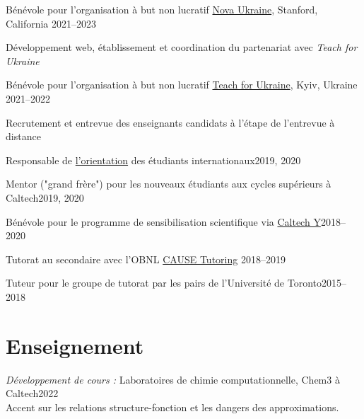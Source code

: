 \documentclass[margin,line]{res}
\newenvironment{list1}{
 \begin{list}{\ding{113}}{%
  \setlength{\itemsep}{0in}
  \setlength{\parsep}{0in} \setlength{\parskip}{0in}
  \setlength{\topsep}{0in} \setlength{\partopsep}{0in} 
  \setlength{\leftmargin}{0.17in}}}{\end{list}}
\begin{document}
\begin{resume}
\vspace*{-1mm}

Bénévole pour l'organisation à but non lucratif \href{https://novaukraine.org/}{Nova Ukraine}, Stanford, California \hfill{2021--2023}

\begin{list1}
\item[]Développement web, établissement et coordination du partenariat avec {\em Teach for Ukraine}
\end{list1}

\vspace{-0.3cm}

Bénévole pour l'organisation à but non lucratif \href{https://teachforukraine.org/en/}{Teach for Ukraine}, Kyiv, Ukraine \hfill{2021--2022}

\begin{list1}
\item[]Recrutement et entrevue des enseignants candidats à l'étape de l'entrevue à distance
\end{list1}

\vspace{-0.3cm}

Responsable de \href{https://international.caltech.edu/Orientation/isp}{l'orientation} des étudiants internationaux\hfill{2019, 2020}

\vspace{-0.3cm}

Mentor ("grand frère") pour les nouveaux étudiants aux cycles supérieurs à Caltech\hfill{2019, 2020}

\vspace{-0.3cm}

Bénévole pour le programme de sensibilisation scientifique via \href{https://www.caltechy.org/student-opportunities}{Caltech Y}\hfill{2018--2020}

\vspace{-0.3cm}

Tutorat au secondaire avec l'OBNL \href{https://www.facebook.com/CauseTutoring/?locale=zh_CN&paipv=0&eav=AfapFTOSVzUFy0ircWljNcf8AswCiGwIsBsPs-au8kmxfK99t_d4mxVNzcEVvxME7Jw&_rdr}{CAUSE Tutoring} \hfill{2018--2019}

\vspace{-0.3cm}

Tuteur pour le groupe de tutorat par les pairs de l'Université de Toronto\hfill{2015--2018}

\section{\sc Enseignement}
{\em Développement de cours :} Laboratoires de chimie computationnelle, Chem3 à Caltech\hfill{2022}\\
Accent sur les relations structure-fonction et les dangers des approximations.


\end{resume}
\end{document}
